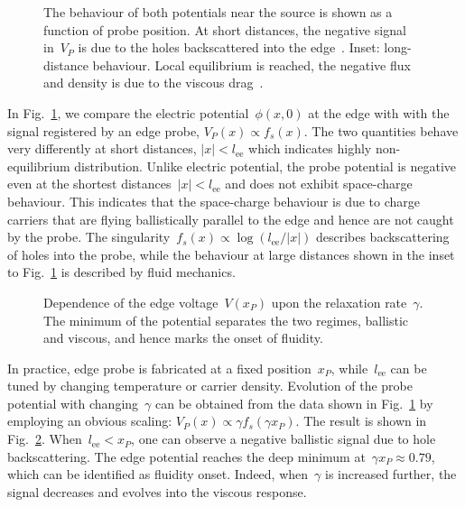 \documentclass[preprint,aps,eqsecnum, prb]{revtex4-1}
\newcommand{\inputpgf}[2]{{%
\let\pgfimageWithoutPath\pgfimage
\renewcommand{\pgfimage}[2][]{\pgfimageWithoutPath[##1]{#1/##2}}

}}
\begin{document}
\begin{figure}[h]
  \def\svgwidth{0.5\textwidth}
  
  \caption{
    \label{fig:edge-flux}
    The behaviour of both potentials near the source is shown
    as a function of probe position.
    At short distances, the negative signal in~$V_P$ is due to
    the holes backscattered into the edge~\cite{bib:Shytov-et-al}.
    Inset: long-distance behaviour. Local equilibrium is reached,
    the negative flux and density is due to the viscous
    drag~\cite{bib:Levitov-Falkovich}.
  }
\end{figure}
In  Fig.~\ref{fig:edge-flux}, we compare the electric potential~$\phi(x, 0)$
at the edge with with the signal registered by an edge probe,
$V_P(x) \propto f_s(x)$. The two quantities behave very differently
at short distances, $|x| < l_\mathrm{ee}$ which indicates highly
non-equilibrium distribution.
Unlike electric potential, the probe potential is negative even at
the shortest distances~$|x| < l_\mathrm{ee}$ and
does not exhibit space-charge behaviour. This indicates that the
space-charge behaviour is due to charge carriers that  are flying ballistically
parallel to the edge and hence are not caught by the probe.
The singularity~$f_s(x) \propto \log (l_\mathrm{ee}/|x|)$
describes  backscattering of holes into the
probe\cite{bib:Shytov-et-al}, while the behaviour
at large distances shown in the inset to Fig.~\ref{fig:edge-flux}
is described by fluid mechanics.
\begin{figure}[h]
 \def\svgwidth{0.5\textwidth}
 
  \caption{
    \label{fig:flux-vs-gamma}
    Dependence of the edge voltage~$V(x_P)$
    upon the relaxation rate~$\gamma$. The minimum of the potential
    separates the two regimes, ballistic and viscous, and hence marks
    the onset of fluidity.
  }
\end{figure}

In practice, edge probe is fabricated at a fixed position~$x_P$,
while~$l_\mathrm{ee}$ can be tuned by changing temperature or
carrier density.
Evolution of the probe potential with changing~$\gamma$
can be obtained from the data shown in Fig.~\ref{fig:edge-flux}
by employing an obvious scaling: $V_P(x) \propto \gamma f_s(\gamma x_P)$.
The result is shown in Fig.~\ref{fig:flux-vs-gamma}.
When~$l_\mathrm{ee} < x_P$,
one can observe a negative ballistic signal due to hole backscattering.
The edge potential reaches the deep minimum at~$\gamma x_P \approx 0.79$,
which can be identified as fluidity onset. Indeed, when~$\gamma$ is
increased further, the signal decreases and evolves into the viscous
response.
\end{document}
